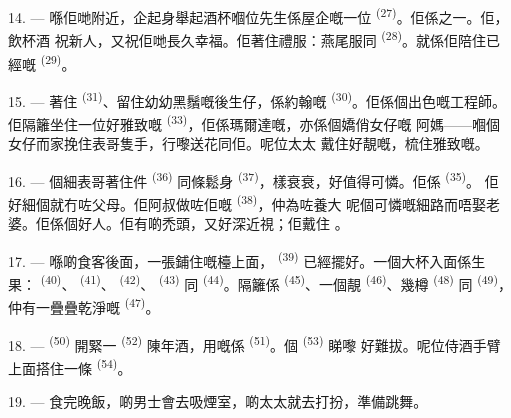 14. --- 喺佢哋附近，企起身舉起酒杯嗰位先生係屋企嘅一位
\textsuperscript{(27)}。佢係之一。佢，飲杯酒
祝新人，又祝佢哋長久幸福。佢著住禮服：燕尾服同
\textsuperscript{(28)}。就係佢陪住已經嘅 \textsuperscript{(29)}。

15. --- 著住 \textsuperscript{(31)}、留住幼幼黑鬚嘅後生仔，係約翰嘅
 \textsuperscript{(30)}。佢係個出色嘅工程師。佢隔籬坐住一位好雅致嘅
 \textsuperscript{(33)}，佢係瑪爾達嘅，亦係個嬌俏女仔嘅
阿媽——嗰個女仔而家挽住表哥隻手，行嚟送花同佢。呢位太太
戴住好靚嘅，梳住雅致嘅。

16. --- 個細表哥著住件 \textsuperscript{(36)} 同條鬆身
\textsuperscript{(37)}，樣衰衰，好值得可憐。佢係 \textsuperscript{(35)}。
佢好細個就冇咗父母。佢阿叔做咗佢嘅 \textsuperscript{(38)}，仲為咗養大
呢個可憐嘅細路而唔娶老婆。佢係個好人。佢有啲禿頭，又好深近視；佢戴住
。

\VUsaut{2.4mm}
\VUsaut{3.0mm}

17. --- 喺啲食客後面，一張鋪住嘅檯上面，
\textsuperscript{(39)} 已經擺好。一個大杯入面係生果：
\textsuperscript{(40)}、 \textsuperscript{(41)}、
\textsuperscript{(42)}、 \textsuperscript{(43)} 同
\textsuperscript{(44)}。隔籬係 \textsuperscript{(45)}、一個靚
 \textsuperscript{(46)}、幾樽 \textsuperscript{(48)} 同
 \textsuperscript{(49)}，仲有一疊疊乾淨嘅
\textsuperscript{(47)}。

18. ---  \textsuperscript{(50)} 開緊一 \textsuperscript{(52)}
陳年酒，用嘅係 \textsuperscript{(51)}。個 \textsuperscript{(53)} 睇嚟
好難拔。呢位侍酒手臂上面搭住一條 \textsuperscript{(54)}。

19. --- 食完晚飯，啲男士會去吸煙室，啲太太就去打扮，準備跳舞。

\VUsaut{5.0mm}
\VUsaut{1.6mm}
\VUsaut{2.6mm}

\VUsaut{3.0mm}

